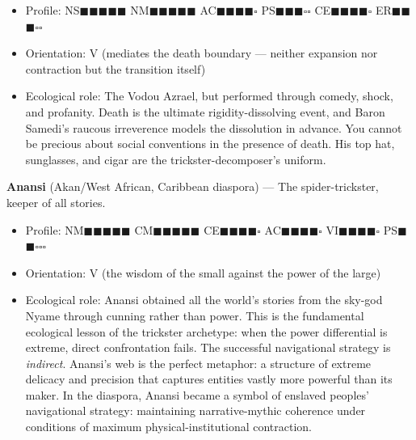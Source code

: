 \begin{itemize}[nosep,leftmargin=*]
  \item Profile: NS$\blacksquare$$\blacksquare$$\blacksquare$$\blacksquare$$\blacksquare$ NM$\blacksquare$$\blacksquare$$\blacksquare$$\blacksquare$$\blacksquare$ AC$\blacksquare$$\blacksquare$$\blacksquare$$\blacksquare$$\square$ PS$\blacksquare$$\blacksquare$$\blacksquare$$\square$$\square$ CE$\blacksquare$$\blacksquare$$\blacksquare$$\blacksquare$$\square$ ER$\blacksquare$$\blacksquare$$\blacksquare$$\square$$\square$
  \item Orientation: V (mediates the death boundary — neither expansion nor contraction but the transition itself)
  \item Ecological role: The Vodou Azrael, but performed through comedy, shock, and profanity. Death is the ultimate rigidity-dissolving event, and Baron Samedi's raucous irreverence models the dissolution in advance. You cannot be precious about social conventions in the presence of death. His top hat, sunglasses, and cigar are the trickster-decomposer's uniform.
\end{itemize}


\textbf{Anansi} (Akan/West African, Caribbean diaspora) — The spider-trickster, keeper of all stories.

\begin{itemize}[nosep,leftmargin=*]
  \item Profile: NM$\blacksquare$$\blacksquare$$\blacksquare$$\blacksquare$$\blacksquare$ CM$\blacksquare$$\blacksquare$$\blacksquare$$\blacksquare$$\blacksquare$ CE$\blacksquare$$\blacksquare$$\blacksquare$$\blacksquare$$\square$ AC$\blacksquare$$\blacksquare$$\blacksquare$$\blacksquare$$\square$ VI$\blacksquare$$\blacksquare$$\blacksquare$$\blacksquare$$\square$ PS$\blacksquare$$\blacksquare$$\square$$\square$$\square$
  \item Orientation: V (the wisdom of the small against the power of the large)
  \item Ecological role: Anansi obtained all the world's stories from the sky-god Nyame through cunning rather than power. This is the fundamental ecological lesson of the trickster archetype: when the power differential is extreme, direct confrontation fails. The successful navigational strategy is \textit{indirect}. Anansi's web is the perfect metaphor: a structure of extreme delicacy and precision that captures entities vastly more powerful than its maker. In the diaspora, Anansi became a symbol of enslaved peoples' navigational strategy: maintaining narrative-mythic coherence under conditions of maximum physical-institutional contraction.
\end{itemize}



